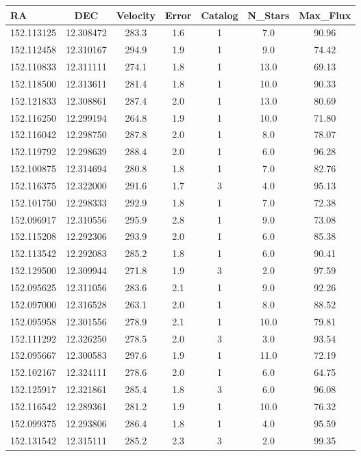 \documentclass[%
 aip,
 jmp,%
 amsmath,amssymb,
 reprint,%
]{aastex61}
\begin{document}
\begin{center}
\begin{longtable}{lcccccc}
RA & DEC & Velocity & Error & Catalog & N_{Stars} & Max_{Flux} \\ \hline
152.113125 & 12.308472 & 283.3 & 1.6 & 1 & 7.0 & 90.96 \\
152.112458 & 12.310167 & 294.9 & 1.9 & 1 & 9.0 & 74.42 \\
152.110833 & 12.311111 & 274.1 & 1.8 & 1 & 13.0 & 69.13 \\
152.118500 & 12.313611 & 281.4 & 1.8 & 1 & 10.0 & 90.33 \\
152.121833 & 12.308861 & 287.4 & 2.0 & 1 & 13.0 & 80.69 \\
152.116250 & 12.299194 & 264.8 & 1.9 & 1 & 10.0 & 71.80 \\
152.116042 & 12.298750 & 287.8 & 2.0 & 1 & 8.0 & 78.07 \\
152.119792 & 12.298639 & 288.4 & 2.0 & 1 & 6.0 & 96.28 \\
152.100875 & 12.314694 & 280.8 & 1.8 & 1 & 7.0 & 82.76 \\
152.116375 & 12.322000 & 291.6 & 1.7 & 3 & 4.0 & 95.13 \\
152.101750 & 12.298333 & 292.9 & 1.8 & 1 & 7.0 & 72.38 \\
152.096917 & 12.310556 & 295.9 & 2.8 & 1 & 9.0 & 73.08 \\
152.115208 & 12.292306 & 293.9 & 2.0 & 1 & 6.0 & 85.38 \\
152.113542 & 12.292083 & 285.2 & 1.8 & 1 & 6.0 & 90.41 \\
152.129500 & 12.309944 & 271.8 & 1.9 & 3 & 2.0 & 97.59 \\
152.095625 & 12.311056 & 283.6 & 2.1 & 1 & 9.0 & 92.26 \\
152.097000 & 12.316528 & 263.1 & 2.0 & 1 & 8.0 & 88.52 \\
152.095958 & 12.301556 & 278.9 & 2.1 & 1 & 10.0 & 79.81 \\
152.111292 & 12.326250 & 278.5 & 2.0 & 3 & 3.0 & 93.54 \\
152.095667 & 12.300583 & 297.6 & 1.9 & 1 & 11.0 & 72.19 \\
152.102167 & 12.324111 & 278.6 & 2.0 & 1 & 6.0 & 64.75 \\
152.125917 & 12.321861 & 285.4 & 1.8 & 3 & 6.0 & 96.08 \\
152.116542 & 12.289361 & 281.2 & 1.9 & 1 & 10.0 & 76.32 \\
152.099375 & 12.293806 & 286.4 & 1.8 & 1 & 4.0 & 95.59 \\
152.131542 & 12.315111 & 285.2 & 2.3 & 3 & 2.0 & 99.35 \\

\end{longtable}
\end{center}
\end{document}
